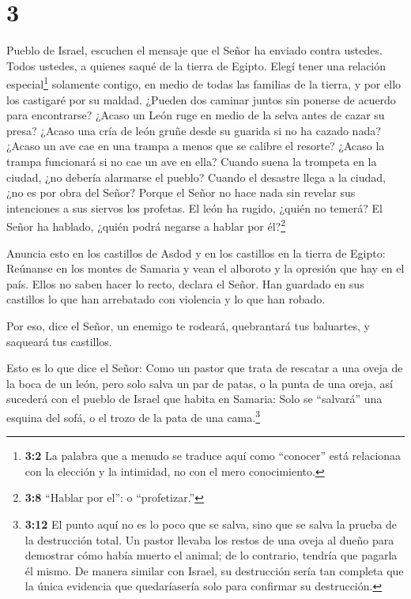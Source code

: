 \hypertarget{section-2}{%
\section{3}\label{section-2}}

 Pueblo de Israel, escuchen el mensaje que el Señor ha
enviado contra ustedes. Todos ustedes, a quienes saqué de la tierra de
Egipto.  Elegí tener una relación especial\footnote{\textbf{3:2}
  La palabra que a menudo se traduce aquí como ``conocer'' está
  relacionaa con la elección y la intimidad, no con el mero
  conocimiento.} solamente contigo, en medio de todas las familias de la
tierra, y por ello los castigaré por su maldad.  ¿Pueden dos
caminar juntos sin ponerse de acuerdo para encontrarse? 
¿Acaso un León ruge en medio de la selva antes de cazar su presa? ¿Acaso
una cría de león gruñe desde su guarida si no ha cazado nada?
 ¿Acaso un ave cae en una trampa a menos que se calibre el
resorte? ¿Acaso la trampa funcionará si no cae un ave en ella?
 Cuando suena la trompeta en la ciudad, ¿no debería
alarmarse el pueblo? Cuando el desastre llega a la ciudad, ¿no es por
obra del Señor?  Porque el Señor no hace nada sin revelar
sus intenciones a sus siervos los profetas.  El león ha
rugido, ¿quién no temerá? El Señor ha hablado, ¿quién podrá negarse a
hablar por él?\footnote{\textbf{3:8} ``Hablar por el'': o
  ``profetizar.''}

 Anuncia esto en los castillos de Asdod y en los castillos
en la tierra de Egipto: Reúnanse en los montes de Samaria y vean el
alboroto y la opresión que hay en el país.  Ellos no saben
hacer lo recto, declara el Señor. Han guardado en sus castillos lo que
han arrebatado con violencia y lo que han robado.

 Por eso, dice el Señor, un enemigo te rodeará, quebrantará
tus baluartes, y saqueará tus castillos.

 Esto es lo que dice el Señor: Como un pastor que trata de
rescatar a una oveja de la boca de un león, pero solo salva un par de
patas, o la punta de una oreja, así sucederá con el pueblo de Israel que
habita en Samaria: Solo se ``salvará'' una esquina del sofá, o el trozo
de la pata de una cama.\footnote{\textbf{3:12} El punto aquí no es lo
  poco que se salva, sino que se salva la prueba de la destrucción
  total. Un pastor llevaba los restos de una oveja al dueño para
  demostrar cómo había muerto el animal; de lo contrario, tendría que
  pagarla él mismo. De manera similar con Israel, su destrucción sería
  tan completa que la única evidencia que quedaríasería solo para
  confirmar su destrucción.}

